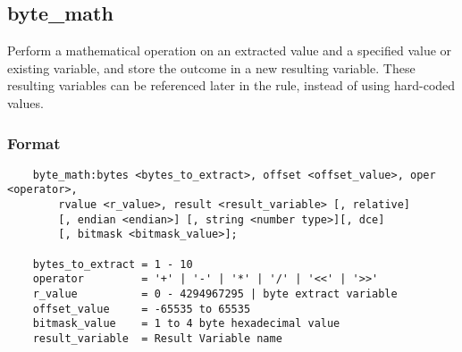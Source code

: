 \documentclass[english]{report}
\begin{document}
\subsection{byte\_math}
\label{sub:byte_math}

Perform a mathematical operation on an extracted value and a specified value 
or existing variable, and store the outcome in a new resulting variable. 
These resulting variables can be referenced later in the rule, 
instead of using hard-coded values.

\subsubsection{Format}

\footnotesize
\begin{verbatim}
    byte_math:bytes <bytes_to_extract>, offset <offset_value>, oper <operator>, 
        rvalue <r_value>, result <result_variable> [, relative] 
        [, endian <endian>] [, string <number type>][, dce] 
        [, bitmask <bitmask_value>];

    bytes_to_extract = 1 - 10
    operator         = '+' | '-' | '*' | '/' | '<<' | '>>'
    r_value          = 0 - 4294967295 | byte extract variable
    offset_value     = -65535 to 65535
    bitmask_value    = 1 to 4 byte hexadecimal value
    result_variable  = Result Variable name
\end{verbatim}
\normalsize
\end{document}
